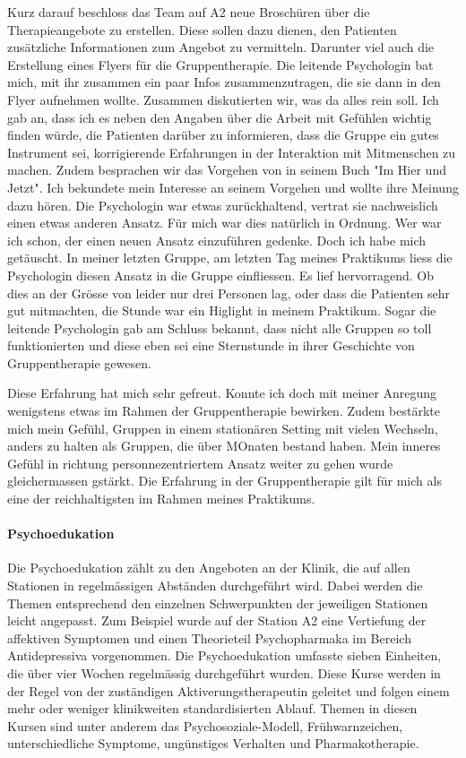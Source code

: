 \documentclass[jou,apacite]{apa6}
\begin{document}
Kurz darauf beschloss das Team auf A2 neue Broschüren über die Therapieangebote zu erstellen. Diese sollen dazu dienen, den Patienten zusätzliche Informationen zum Angebot zu vermitteln. Darunter viel auch die Erstellung eines Flyers für die Gruppentherapie. Die leitende Psychologin bat mich, mit ihr zusammen ein paar Infos zusammenzutragen, die sie dann in den Flyer aufnehmen wollte. Zusammen diskutierten wir, was da alles rein soll. Ich gab an, dass ich es neben den Angaben über die Arbeit mit Gefühlen wichtig finden würde, die Patienten darüber zu informieren, dass die Gruppe ein gutes Instrument sei, korrigierende Erfahrungen in der Interaktion mit Mitmenschen zu machen. Zudem besprachen wir das Vorgehen von  in seinem Buch "Im Hier und Jetzt". Ich bekundete mein Interesse an seinem Vorgehen und wollte ihre Meinung dazu hören. Die Psychologin war etwas zurückhaltend, vertrat sie nachweislich einen etwas anderen Ansatz. Für mich war dies natürlich in Ordnung. Wer war ich schon, der einen neuen Ansatz einzuführen gedenke. Doch ich habe mich getäuscht. In meiner letzten Gruppe, am letzten Tag meines Praktikums liess die Psychologin diesen Ansatz in die Gruppe einfliessen. Es lief hervorragend. Ob dies an der Grösse von leider nur drei Personen lag, oder dass die Patienten sehr gut mitmachten, die Stunde war ein Higlight in meinem Praktikum. Sogar die leitende Psychologin gab am Schluss bekannt, dass nicht alle Gruppen so toll funktionierten und diese eben sei eine Sternstunde in ihrer Geschichte von Gruppentherapie gewesen. 

Diese Erfahrung hat mich sehr gefreut. Konnte ich doch mit meiner Anregung wenigstens etwas im Rahmen der Gruppentherapie bewirken. Zudem bestärkte mich mein Gefühl, Gruppen in einem stationären Setting mit vielen Wechseln, anders zu halten als Gruppen, die über MOnaten bestand haben. Mein inneres Gefühl in richtung personnezentriertem Ansatz weiter zu gehen wurde gleichermassen gstärkt. Die Erfahrung in der Gruppentherapie gilt für mich als eine der reichhaltigsten im Rahmen meines Praktikums.

\paragraph{Psychoedukation}
Die Psychoedukation zählt zu den Angeboten an der Klinik, die auf allen Stationen in regelmässigen Abständen durchgeführt wird. Dabei werden die Themen entsprechend den einzelnen Schwerpunkten der jeweiligen Stationen leicht angepasst. Zum Beispiel wurde auf der Station A2 eine Vertiefung der affektiven Symptomen und einen Theorieteil Psychopharmaka im Bereich Antidepressiva vorgenommen. Die Psychoedukation umfasste sieben Einheiten, die über vier Wochen regelmässig durchgeführt wurden. Diese Kurse werden in der Regel von der zuständigen Aktiverungstherapeutin geleitet und folgen einem mehr oder weniger klinikweiten standardisierten Ablauf. Themen in diesen Kursen sind unter anderem das Psychosoziale-Modell, Frühwarnzeichen, unterschiedliche Symptome, ungünstiges Verhalten und Pharmakotherapie.
\end{document}
